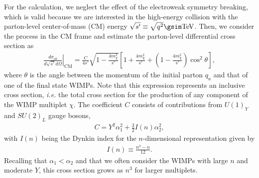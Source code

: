 \documentclass[12pt,twoside,book]{article}
\begin{document}
For the calculation, we neglect the effect of the electroweak symmetry breaking, which is valid because we are interested in the high-energy collision with the parton-level center-of-mass (CM) energy $\sqrt{s'} \equiv \sqrt{q^2} \gsim \mathrm{TeV}$.
Then, we consider the process in the CM frame and estimate the parton-level differential cross section as
\begin{align}
  \left. \frac{d \sigma_{a b}}{d \sqrt{s'} d \Omega} \right|_{\text{CM}}
  = \frac{C}{4 s'} \sqrt{1 - \frac{4 m_\chi^2}{s'}}
  \left[ 1 + \frac{4 m_\chi^2}{s'} + \left( 1 - \frac{4 m_\chi^2}{s'} \right) \cos^2 \theta \right],
\end{align}
where $\theta$ is the angle between the momentum of the initial parton $q_a$ and that of one of the final state WIMPs.
Note that this expression represents an inclusive cross section, \textit{i.e.} the total cross section for the production of any component of the WIMP multiplet $\chi$.
The coefficient $C$ consists of contributions from $U(1)_Y$ and $SU(2)_L$ gauge bosons,
\begin{align}
  C = Y^2 \alpha_1^2 + \frac{3}{2} I(n) \alpha_2^2,
\end{align}
with $I(n)$ being the Dynkin index for the $n$-dimensional representation given by
\begin{align}
  I(n) \equiv \frac{n^3-n}{12}.
\end{align}
Recalling that $\alpha_1 < \alpha_2$ and that we often consider the WIMPs with large $n$ and moderate $Y$, this cross section grows as $n^3$ for larger multiplets.
\end{document}

